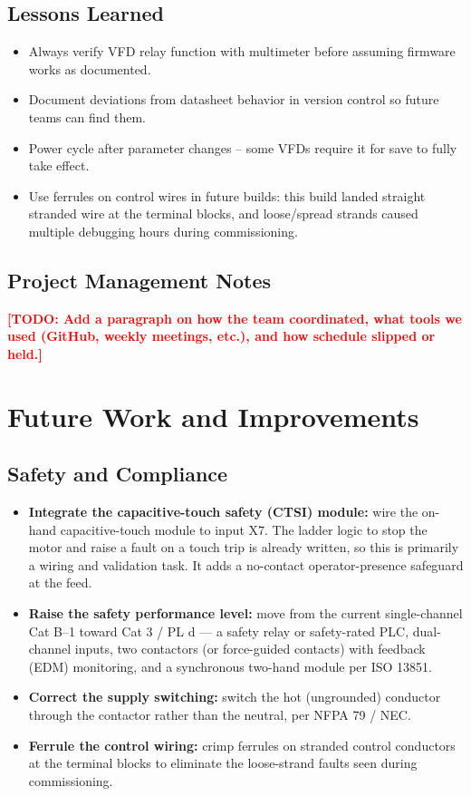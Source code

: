 \documentclass[hidelinks,12pt]{article}
\newcommand{\todo}[1]{\textcolor{red}{\textbf{[TODO: #1]}}}
\begin{document}
\subsection{Lessons Learned}
\begin{itemize}
    \item Always verify VFD relay function with multimeter before assuming firmware works as documented.
    \item Document deviations from datasheet behavior in version control so future teams can find them.
    \item Power cycle after parameter changes -- some VFDs require it for save to fully take effect.
    \item Use ferrules on control wires in future builds: this build landed straight stranded wire at the terminal blocks, and loose/spread strands caused multiple debugging hours during commissioning.
\end{itemize}

\subsection{Project Management Notes}
\todo{Add a paragraph on how the team coordinated, what tools we used (GitHub, weekly meetings, etc.), and how schedule slipped or held.}

\section{Future Work and Improvements}

\subsection{Safety and Compliance}
\begin{itemize}
    \item \textbf{Integrate the capacitive-touch safety (CTSI) module:} wire the on-hand capacitive-touch module to input X7. The ladder logic to stop the motor and raise a fault on a touch trip is already written, so this is primarily a wiring and validation task. It adds a no-contact operator-presence safeguard at the feed.
    \item \textbf{Raise the safety performance level:} move from the current single-channel Cat B--1 toward Cat 3 / PL d --- a safety relay or safety-rated PLC, dual-channel inputs, two contactors (or force-guided contacts) with feedback (EDM) monitoring, and a synchronous two-hand module per ISO 13851.
    \item \textbf{Correct the supply switching:} switch the hot (ungrounded) conductor through the contactor rather than the neutral, per NFPA 79 / NEC.
    \item \textbf{Ferrule the control wiring:} crimp ferrules on stranded control conductors at the terminal blocks to eliminate the loose-strand faults seen during commissioning.
\end{itemize}
\end{document}

